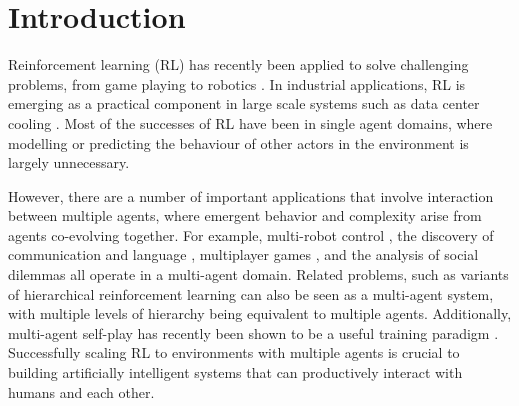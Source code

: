 \documentclass{article}
\newcommand{\comment}[1]{\textbf{\textcolor{red}{comment: #1}}}
\begin{document}
\section{Introduction}
Reinforcement learning (RL) has recently been applied to solve challenging problems, from game playing \cite{mnih2015human,alphago} to robotics \cite{levine2015end}. In industrial applications, RL is emerging as a practical component in large scale systems such as data center cooling \cite{googleblog}. 
Most of the successes of RL have been in single agent domains, where modelling or predicting the behaviour of other actors in the environment is largely unnecessary.

However, there are a number of important applications that involve interaction between multiple agents, where emergent behavior and complexity arise from agents co-evolving together. For example, multi-robot control \cite{matignon12coordinated}, the discovery of communication and language \cite{sukhbaatar2016learning,foerster16b,mordatch2017emergence}, multiplayer games \cite{peng17starcraft}, and the analysis of social dilemmas \cite{multiagent_ssd} all operate in a multi-agent domain. Related problems, such as variants of hierarchical reinforcement learning \cite{dayan93feudal} can also be seen as a multi-agent system, with multiple levels of hierarchy being equivalent to multiple agents. Additionally, multi-agent self-play has recently been shown to be a useful training paradigm \cite{alphago, sukhbaatar2017intrinsic}. 
Successfully scaling RL to environments with multiple agents is crucial to building artificially intelligent systems that can productively interact with humans and each other.

\end{document}
